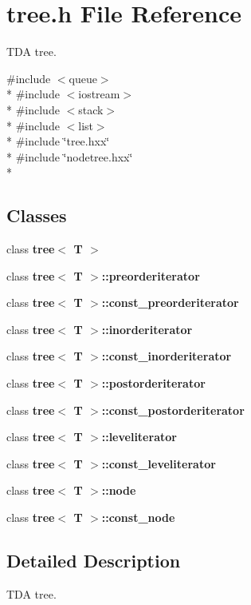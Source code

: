 \section{tree.\+h File Reference}
\label{tree_8h}


T\+D\+A tree.  


{\ttfamily \#include $<$queue$>$}\\*
{\ttfamily \#include $<$iostream$>$}\\*
{\ttfamily \#include $<$stack$>$}\\*
{\ttfamily \#include $<$list$>$}\\*
{\ttfamily \#include \char`\"{}tree.\+hxx\char`\"{}}\\*
{\ttfamily \#include \char`\"{}nodetree.\+hxx\char`\"{}}\\*
\subsection*{Classes}
\begin{DoxyCompactItemize}
\item 
class {\bf tree$<$ T $>$}
\item 
class {\bf tree$<$ T $>$\+::preorderiterator}
\item 
class {\bf tree$<$ T $>$\+::const\+\_\+preorderiterator}
\item 
class {\bf tree$<$ T $>$\+::inorderiterator}
\item 
class {\bf tree$<$ T $>$\+::const\+\_\+inorderiterator}
\item 
class {\bf tree$<$ T $>$\+::postorderiterator}
\item 
class {\bf tree$<$ T $>$\+::const\+\_\+postorderiterator}
\item 
class {\bf tree$<$ T $>$\+::leveliterator}
\item 
class {\bf tree$<$ T $>$\+::const\+\_\+leveliterator}
\item 
class {\bf tree$<$ T $>$\+::node}
\item 
class {\bf tree$<$ T $>$\+::const\+\_\+node}
\end{DoxyCompactItemize}


\subsection{Detailed Description}
T\+D\+A tree. 

